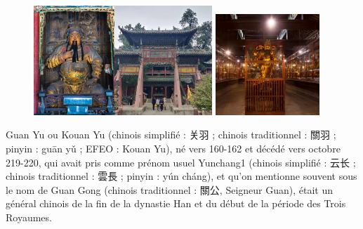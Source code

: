 \begin{Ex}[Guan Yu ]
        \begin{figure}[!h]
        \centering
                \includegraphics[width=0.6\textwidth]{ConfucianismeTaoismeBouddhismeChinois/Images/TempleGuanYu.png}
                \includegraphics[width=0.35\textwidth]{ConfucianismeTaoismeBouddhismeChinois/Images/StatueGuanYu.jpg}
        

        \label{fig:enter-label}
    \end{figure}
    Guan Yu ou Kouan Yu (chinois simplifié : 关羽 ; chinois traditionnel : 關羽 ; pinyin : guān yǔ ; EFEO : Kouan Yu), né vers 160-162 et décédé vers octobre 219-220, qui avait pris comme prénom usuel Yunchang1 (chinois simplifié : 云长 ; chinois traditionnel : 雲長 ; pinyin : yún cháng), et qu'on mentionne souvent sous le nom de Guan Gong (chinois traditionnel : 關公, Seigneur Guan), était un général chinois de la fin de la dynastie Han et du début de la période des Trois Royaumes.


\end{Ex}
